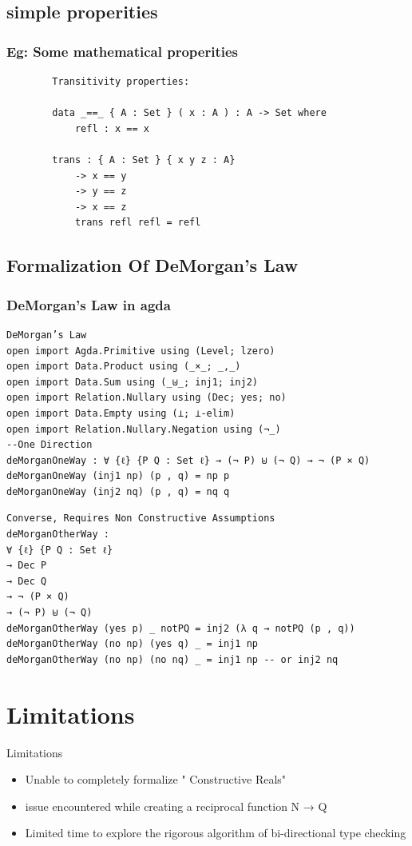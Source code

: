 \documentclass[aspectratio=169, 12pt]{beamer}
\begin{document}
\subsection*{simple properities  } 
\begin{frame}[fragile]
    \frametitle{Eg: Some mathematical properities }
    \begin{verbatim}
        Transitivity properties: 

        data _==_ { A : Set } ( x : A ) : A -> Set where
            refl : x == x

        trans : { A : Set } { x y z : A}
            -> x == y
            -> y == z
            -> x == z
            trans refl refl = refl
    \end{verbatim}
\end{frame}
\subsection{Formalization Of DeMorgan's Law} 
\begin{frame}[fragile]
    \frametitle{DeMorgan's Law in agda}
   \footnotesize \begin{verbatim}
DeMorgan’s Law
open import Agda.Primitive using (Level; lzero)
open import Data.Product using (_×_; _,_)
open import Data.Sum using (_⊎_; inj1; inj2)
open import Relation.Nullary using (Dec; yes; no)
open import Data.Empty using (⊥; ⊥-elim)
open import Relation.Nullary.Negation using (¬_)
--One Direction
deMorganOneWay : ∀ {ℓ} {P Q : Set ℓ} → (¬ P) ⊎ (¬ Q) → ¬ (P × Q)
deMorganOneWay (inj1 np) (p , q) = np p
deMorganOneWay (inj2 nq) (p , q) = nq q

    \end{verbatim}
    
\end{frame}
\begin{frame}[fragile]

    \small \begin{verbatim}
Converse, Requires Non Constructive Assumptions
deMorganOtherWay :
∀ {ℓ} {P Q : Set ℓ}
→ Dec P
→ Dec Q
→ ¬ (P × Q)
→ (¬ P) ⊎ (¬ Q)
deMorganOtherWay (yes p) _ notPQ = inj2 (λ q → notPQ (p , q))
deMorganOtherWay (no np) (yes q) _ = inj1 np
deMorganOtherWay (no np) (no nq) _ = inj1 np -- or inj2 nq
    \end{verbatim}
    
\end{frame}
\section{Limitations}
\begin{frame}{Limitations}
    \begin{itemize}
        \item Unable to completely formalize " Constructive Reals" 
        \item issue encountered while creating a reciprocal function N → Q  
        \item Limited time to explore the rigorous algorithm of bi-directional type checking
     
    \end{itemize}
\end{frame} 


  
\end{document}
